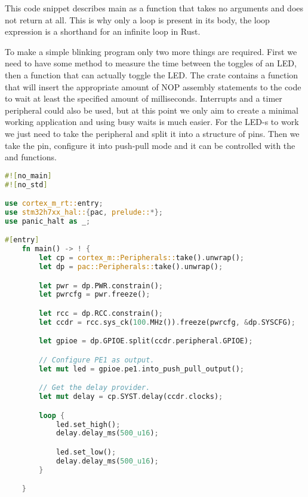 This code snippet describes main as a function that takes no arguments and does not return at all. This is why only a loop is present in its body, the loop expression is a shorthand for an infinite loop in Rust.

To make a simple blinking program only two more things are required. First we need to have some method to measure the time between the toggles of an LED, then a function that can actually toggle the LED. The  crate contains a  function that will insert the appropriate amount of NOP assembly statements to the code to wait at least the specified amount of milliseconds. Interrupts and a timer peripheral could also be used, but at this point we only aim to create a minimal working application and using busy waits is much easier. For the LED-s to work we just need to take the  peripheral and split it into a structure of pins. Then we take the  pin, configure it into push-pull mode and it can be controlled with the  and  functions.

\begin{lstlisting}[language=Rust,frame=single,float=!ht,style=customrust,label={lst:embedded-hello-world},caption={Embedded Hello World (Blink) in Rust}]
#![no_main]
#![no_std]

use cortex_m_rt::entry;
use stm32h7xx_hal::{pac, prelude::*};
use panic_halt as _;

#[entry]
    fn main() -> ! {
        let cp = cortex_m::Peripherals::take().unwrap();
        let dp = pac::Peripherals::take().unwrap();

        let pwr = dp.PWR.constrain();
        let pwrcfg = pwr.freeze();

        let rcc = dp.RCC.constrain();
        let ccdr = rcc.sys_ck(100.MHz()).freeze(pwrcfg, &dp.SYSCFG);

        let gpioe = dp.GPIOE.split(ccdr.peripheral.GPIOE);

        // Configure PE1 as output.
        let mut led = gpioe.pe1.into_push_pull_output();

        // Get the delay provider.
        let mut delay = cp.SYST.delay(ccdr.clocks);

        loop {
            led.set_high();
            delay.delay_ms(500_u16);

            led.set_low();
            delay.delay_ms(500_u16);
        }

    }
\end{lstlisting}

